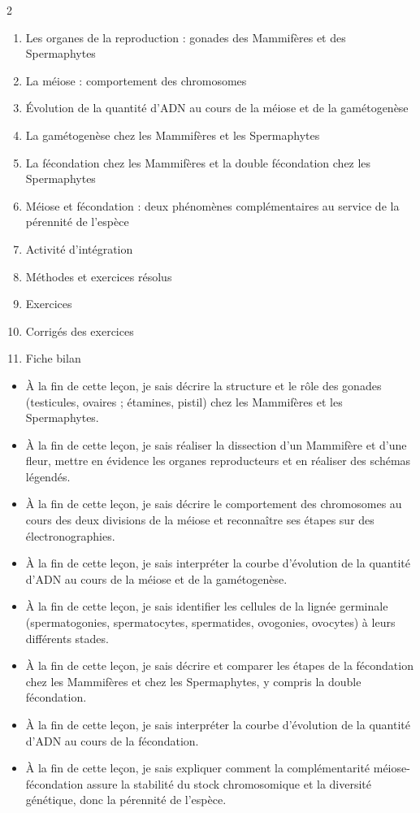 \documentclass[11pt]{article}
\begin{document}
\begin{sommaire}
\begin{multicols}{2}
\begin{enumerate}
\item Les organes de la reproduction : gonades des Mammifères et des Spermaphytes
\item La méiose : comportement des chromosomes
\item Évolution de la quantité d'ADN au cours de la méiose et de la gamétogenèse
\item La gamétogenèse chez les Mammifères et les Spermaphytes
\item La fécondation chez les Mammifères et la double fécondation chez les Spermaphytes
\item Méiose et fécondation : deux phénomènes complémentaires au service de la pérennité de l'espèce
\item Activité d'intégration
\item Méthodes et exercices résolus
\item Exercices
\item Corrigés des exercices
\item Fiche bilan
\end{enumerate}
\end{multicols}
\end{sommaire}

\begin{objectifs}
\begin{itemize}
\item À la fin de cette leçon, je sais décrire la structure et le rôle des gonades (testicules, ovaires ; étamines, pistil) chez les Mammifères et les Spermaphytes.
\item À la fin de cette leçon, je sais réaliser la dissection d'un Mammifère et d'une fleur, mettre en évidence les organes reproducteurs et en réaliser des schémas légendés.
\item À la fin de cette leçon, je sais décrire le comportement des chromosomes au cours des deux divisions de la méiose et reconnaître ses étapes sur des électronographies.
\item À la fin de cette leçon, je sais interpréter la courbe d'évolution de la quantité d'ADN au cours de la méiose et de la gamétogenèse.
\item À la fin de cette leçon, je sais identifier les cellules de la lignée germinale (spermatogonies, spermatocytes, spermatides, ovogonies, ovocytes) à leurs différents stades.
\item À la fin de cette leçon, je sais décrire et comparer les étapes de la fécondation chez les Mammifères et chez les Spermaphytes, y compris la double fécondation.
\item À la fin de cette leçon, je sais interpréter la courbe d'évolution de la quantité d'ADN au cours de la fécondation.
\item À la fin de cette leçon, je sais expliquer comment la complémentarité méiose-fécondation assure la stabilité du stock chromosomique et la diversité génétique, donc la pérennité de l'espèce.
\end{itemize}
\end{objectifs}
\end{document}
